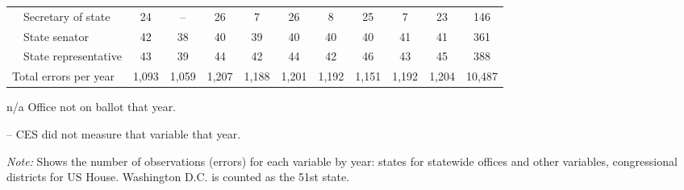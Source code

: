 \begin{table}[!htbp]
{\begin{threeparttable}
\begin{tabular}{lcccccccccc}
~~Secretary of state & 24 & -- & 26 & 7 & 26 & 8 & 25 & 7 & 23 & 146 \\
~~State senator & 42 & 38 & 40 & 39 & 40 & 40 & 40 & 41 & 41 & 361 \\
~~State representative & 43 & 39 & 44 & 42 & 44 & 42 & 46 & 43 & 45 & 388 \\
\midrule
Total errors per year & 1,093 & 1,059 & 1,207 & 1,188 & 1,201 & 1,192 & 1,151 & 1,192 & 1,204 & 10,487 \\
\bottomrule
\end{tabular}
\begin{tablenotes}
\footnotesize
\item n/a Office not on ballot that year.
\item -- CES did not measure that variable that year.
\item \textit{Note:} Shows the number of observations (errors) for each variable by year: states for statewide offices and other variables, congressional districts for US House. Washington D.C. is counted as the 51st state.
\end{tablenotes}
\end{threeparttable}%
}
\end{table}